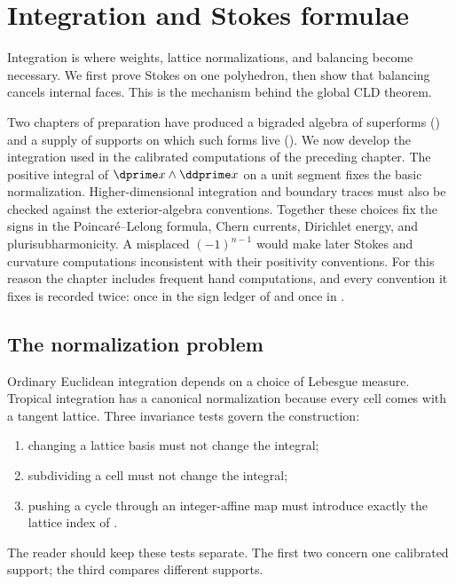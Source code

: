 \chapter{Integration and Stokes formulae}
\label{chap:tropical-integration}

Integration is where weights, lattice normalizations, and balancing become necessary.
We first prove Stokes on one polyhedron, then show that balancing cancels
internal faces. This is the mechanism behind the global CLD theorem.

Two chapters of preparation have produced a bigraded algebra of superforms
() and a supply of supports on which such forms live
().  We now develop the integration used in the
calibrated computations of the preceding chapter.  The positive integral
of $\dprime x\wedge\ddprime x$ on a unit segment fixes the basic
normalization.  Higher-dimensional integration and boundary traces must
also be checked against the exterior-algebra conventions.  Together these
choices fix the signs in the Poincar\'e--Lelong formula, Chern currents,
Dirichlet energy, and plurisubharmonicity.  A misplaced $(-1)^{n-1}$ would
make later Stokes and curvature computations inconsistent with their
positivity conventions.  For this reason the chapter includes frequent
hand computations, and every convention it
fixes is recorded twice: once in the sign ledger of
 and once in .

\section{The normalization problem}
\label{sec:ch11-normalization}

Ordinary Euclidean integration depends on a choice of Lebesgue measure.
Tropical integration has a canonical normalization because every cell comes
with a tangent lattice.  Three invariance tests govern the construction:
\begin{enumerate}
\item changing a lattice basis must not change the integral;
\item subdividing a cell must not change the integral;
\item pushing a cycle through an integer-affine map must introduce exactly
  the lattice index of .
\end{enumerate}
The reader should keep these tests separate.  The first two concern one
calibrated support; the third compares different supports.

